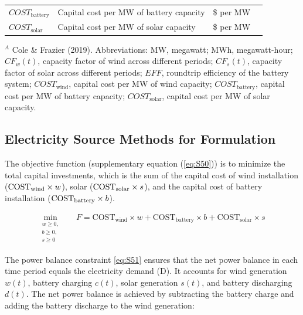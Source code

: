 \documentclass{article}
\begin{document}
\begin{table}[H]
\begin{threeparttable}
\begin{tabular}{@{}lp{8cm}cp{4cm}@{}}
      $COST_{\text{battery}}$ & Capital cost per MW of battery capacity & \$ per MW & \\
      $COST_{\text{solar}}$ & Capital cost per MW of solar capacity & \$ per MW & \\ \bottomrule
    \end{tabular}
\begin{tablenotes}
  \small
  \item $^A$ Cole \& Frazier (2019). Abbreviations: MW, megawatt; MWh, megawatt-hour; $CF_w(t)$, capacity factor of wind across different periods; $CF_s(t)$, capacity factor of solar across different periods; $EFF$, roundtrip efficiency of the battery system; $COST_{\text{wind}}$, capital cost per MW of wind capacity; $COST_{\text{battery}}$, capital cost per MW of battery capacity; $COST_{\text{solar}}$, capital cost per MW of solar capacity.
\end{tablenotes}

  \end{threeparttable}
\end{table}

\subsection{Electricity Source Methods for Formulation}

The objective function (supplementary equation (\ref{eq:S50})) is to minimize the total capital investments, which is the sum of the capital cost of wind installation (\(\text{COST}\textsubscript{wind} \times w\)), solar (\(\text{COST}\textsubscript{solar} \times s\)), and the capital cost of battery installation (\(\text{COST}\textsubscript{battery} \times b\)).

\begin{equation}
\begin{aligned}
\min_{\substack{w \geq 0, \\ b \geq 0, \\ s \geq 0}} & \quad F = \text{COST}_{\text{wind}} \times w + \text{COST}_{\text{battery}} \times b + \text{COST}_{\text{solar}} \times s
\end{aligned}
\label{eq:S50}
\end{equation}

The power balance constraint \eqref{eq:S51} ensures that the net power balance in each time period equals the electricity demand (D). It accounts for wind generation \(w(t)\), battery charging \(c(t)\), solar generation \(s(t)\), and battery discharging \(d(t)\). The net power balance is achieved by subtracting the battery charge and adding the battery discharge to the wind generation:
\end{document}

